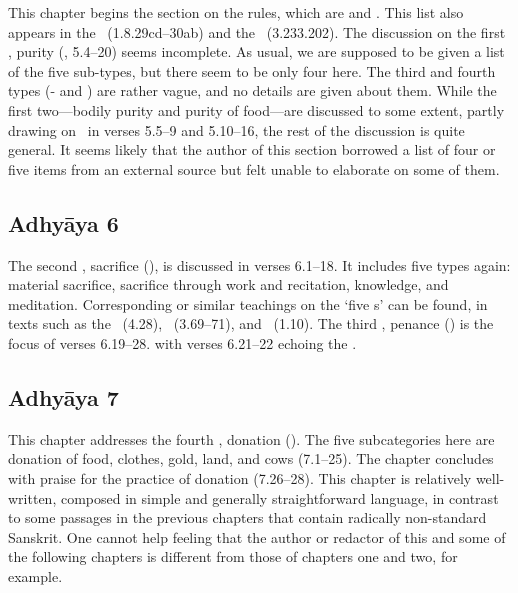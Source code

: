 This chapter begins the section on the  rules, which are
 and . This list also appears in the
\LinPu\ (1.8.29cd--30ab) and the \VDhU\ (3.233.202).
The discussion on the first , purity (, 5.4--20) seems
incomplete. As usual, we are supposed to be given a list of the five sub-types, 
but there seem to be only four here. The third and fourth types
(- and ) are rather vague, and 
no details are given about them. 
While the first two---bodily purity and purity of food---are 
discussed to some extent, partly drawing on \Manu\ in verses 5.5--9 and 5.10--16, 
the rest of the discussion is quite general. It seems likely that
the author of this section borrowed a list of four or five items from 
an external source but felt unable to elaborate on some of them.




\subsection{Adhyāya 6}\label{contents_of_ch06}
The second , sacrifice (), is discussed in verses
6.1--18. It includes five types again: material sacrifice, sacrifice through
work and recitation, knowledge, and meditation. Corresponding
or similar teachings on the `five s' can be found, in texts
such as the \BhG\ (4.28), \Manu\ (3.69--71), and \SDhU\ (1.10).
The third , penance () is the focus of verses 6.19--28.
with verses 6.21--22 echoing the \MBh.


\subsection{Adhyāya 7}\label{contents_of_ch07}
This chapter addresses the fourth , donation ().
The five subcategories here are donation of food, clothes, gold, land, and cows
(7.1--25). The chapter concludes with praise for the practice of donation (7.26--28).
This chapter is relatively well-written, composed in simple and generally
straightforward language, in contrast to some passages in the previous
chapters that contain radically non-standard Sanskrit. One cannot help feeling that the
author or redactor of this and some of the following chapters is different
from those of chapters one and two, for example.



